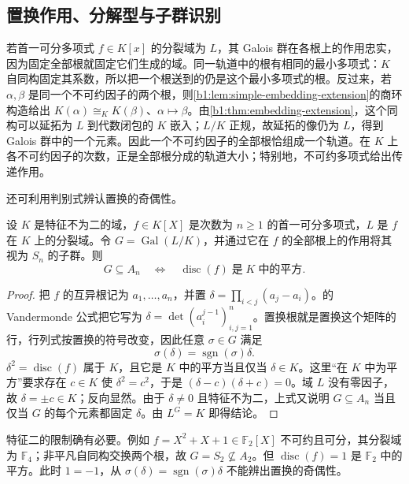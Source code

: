 \subsection{置换作用、分解型与子群识别}
\label{b1:subsec:1903:03}

若首一可分多项式 \(f\in K[x]\) 的分裂域为 \(L\)，其 Galois 群在各根上的作用忠实，因为固定全部根就固定它们生成的域。同一轨道中的根有相同的最小多项式：\(K\) 自同构固定其系数，所以把一个根送到的仍是这个最小多项式的根。反过来，若 \(\alpha,\beta\) 是同一个不可约因子的两个根，则\cref{b1:lem:simple-embedding-extension}的商环构造给出 \(K(\alpha)\cong_KK(\beta)\)、\(\alpha\mapsto\beta\)。由\cref{b1:thm:embedding-extension}，这个同构可以延拓为 \(L\) 到代数闭包的 \(K\) 嵌入；\(L/K\) 正规，故延拓的像仍为 \(L\)，得到 Galois 群中的一个元素。因此一个不可约因子的全部根恰组成一个轨道。在 \(K\) 上各不可约因子的次数，正是全部根分成的轨道大小；特别地，不可约多项式给出传递作用。

\ProseParagraphBreak
还可利用判别式辨认置换的奇偶性。
\begin{proposition}[判别式判据]\label{b1:prop:discriminant-alternating-group}
	设 \(K\) 是特征不为二的域，\(f\in K[X]\) 是次数为 \(n\geq1\) 的首一可分多项式，\(L\) 是 \(f\) 在 \(K\) 上的分裂域。令 \(G=\operatorname{Gal}(L/K)\)，并通过它在 \(f\) 的全部根上的作用将其视为 \(S_n\) 的子群。则
	\begin{equation}\label{b1:eq:discriminant-alternating-group}
		G\subseteq A_n\quad\Longleftrightarrow\quad \operatorname{disc}(f)\;\text{是}\;K\;\text{中的平方}.
	\end{equation}
\end{proposition}
\begin{proof}
	把 \(f\) 的互异根记为 \(a_1,\ldots,a_n\)，并置 \(\delta=\prod_{i<j}(a_j-a_i)\)。的 Vandermonde 公式把它写为 \(\delta=\det(a_i^{j-1})_{i,j=1}^n\)。置换根就是置换这个矩阵的行，行列式按置换的符号改变，因此任意 \(\sigma\in G\) 满足
	\[
		\sigma(\delta)=\operatorname{sgn}(\sigma)\delta.
	\]
	\(\delta^2=\operatorname{disc}(f)\) 属于 \(K\)，且它是 \(K\) 中的平方当且仅当 \(\delta\in K\)。这里“在 \(K\) 中为平方”要求存在 \(c\in K\) 使 \(\delta^2=c^2\)，于是 \((\delta-c)(\delta+c)=0\)。域 \(L\) 没有零因子，故 \(\delta=\pm c\in K\)；反向显然。由于 \(\delta\ne0\) 且特征不为二，上式又说明 \(G\subseteq A_n\) 当且仅当 \(G\) 的每个元素都固定 \(\delta\)。由 \(L^G=K\) 即得结论。
\end{proof}

特征二的限制确有必要。例如 \(f=X^2+X+1\in\mathbb F_2[X]\) 不可约且可分，其分裂域为 \(\mathbb F_4\)；非平凡自同构交换两个根，故 \(G=S_2\not\subseteq A_2\)。但 \(\operatorname{disc}(f)=1\) 是 \(\mathbb F_2\) 中的平方。此时 \(1=-1\)，从 \(\sigma(\delta)=\operatorname{sgn}(\sigma)\delta\) 不能辨出置换的奇偶性。


